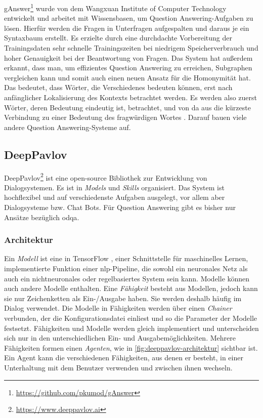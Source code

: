 gAnswer\footnote{\url{https://github.com/pkumod/gAnswer}} \citep{ganswer2} wurde von dem Wangxuan Institute of Computer Technology entwickelt und arbeitet mit Wissensbasen, um Question Answering-Aufgaben zu lösen.
Hierfür werden die Fragen in Unterfragen aufgespalten und daraus je ein Syntaxbaum erstellt.
Es erzielte durch eine durchdachte Vorbereitung der Trainingsdaten sehr schnelle Trainingszeiten bei niedrigem Speicherverbrauch und hoher Genauigkeit bei der Beantwortung von Fragen.
Das System hat außerdem erkannt, dass man, um effizientes Question Answering zu erreichen, Subgraphen vergleichen kann und somit auch einen neuen Ansatz für die Homonymität hat.
Das bedeutet, dass Wörter, die Verschiedenes bedeuten können, erst nach anfänglicher Lokalisierung des Kontexts betrachtet werden.
Es werden also zuerst Wörter, deren Bedeutung eindeutig ist, betrachtet, und von da aus die kürzeste Verbindung zu einer Bedeutung des fragwürdigen Wortes \citep{ganswerapproach}.
Darauf bauen viele andere Question Answering-Systeme auf.

\subsection{DeepPavlov}
DeepPavlov\footnote{\url{https://www.deeppavlov.ai}} \citep{deeppavlov} ist eine open-source Bibliothek zur Entwicklung von Dialogsystemen.
Es ist in \emph{Models} und \emph{Skills} organisiert.
Das System ist hochflexibel und auf verschiedenste Aufgaben ausgelegt, vor allem aber Dialogsysteme bzw. Chat Bots.
Für Question Answering gibt es bisher nur Ansätze bezüglich \ac{odqa}.

\subsubsection{Architektur}
Ein \emph{Modell} ist eine in TensorFlow \citep{tensorflow}, einer Schnittstelle für maschinelles Lernen, implementierte Funktion einer \ac{nlp}-Pipeline,
die sowohl ein neuronales Netz als auch ein nichtneuronales oder regelbasiertes System sein kann.
Modelle können auch andere Modelle enthalten.
Eine \emph{Fähigkeit} besteht aus Modellen, jedoch kann sie nur Zeichenketten als Ein-/Ausgabe haben.
Sie werden deshalb häufig im Dialog verwendet.
Die Modelle in Fähigkeiten werden über einen \emph{Chainer} verbunden, der die Konfigurationsdatei einliest und so die Parameter der Modelle festsetzt.
Fähigkeiten und Modelle werden gleich implementiert und unterscheiden sich nur in den unterschiedlichen Ein- und Ausgabemöglichkeiten.
Mehrere Fähigkeiten formen einen \emph{Agenten}, wie in \cref{fig:deeppavlov-architektur} sichtbar ist.
Ein Agent kann die verschiedenen Fähigkeiten, aus denen er besteht, in einer Unterhaltung mit dem Benutzer verwenden und zwischen ihnen wechseln.

